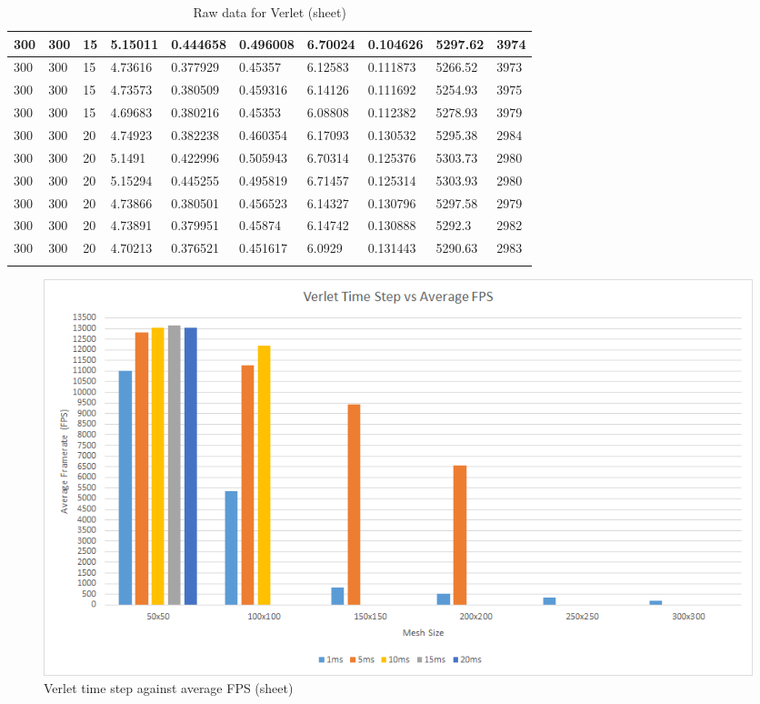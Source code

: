 \begin{landscape}
\begin{longtable}{ | l | l | l | l | l | l | l | l | l | l | }
300 & 300 & 15 & 5.15011 & 0.444658 & 0.496008 & 6.70024 & 0.104626 & 5297.62 & 3974\\ \hline
300 & 300 & 15 & 4.73616 & 0.377929 & 0.45357 & 6.12583 & 0.111873 & 5266.52 & 3973\\ \hline
300 & 300 & 15 & 4.73573 & 0.380509 & 0.459316 & 6.14126 & 0.111692 & 5254.93 & 3975\\ \hline
300 & 300 & 15 & 4.69683 & 0.380216 & 0.45353 & 6.08808 & 0.112382 & 5278.93 & 3979\\ \hline
300 & 300 & 20 & 4.74923 & 0.382238 & 0.460354 & 6.17093 & 0.130532 & 5295.38 & 2984\\ \hline
300 & 300 & 20 & 5.1491 & 0.422996 & 0.505943 & 6.70314 & 0.125376 & 5303.73 & 2980\\ \hline
300 & 300 & 20 & 5.15294 & 0.445255 & 0.495819 & 6.71457 & 0.125314 & 5303.93 & 2980\\ \hline
300 & 300 & 20 & 4.73866 & 0.380501 & 0.456523 & 6.14327 & 0.130796 & 5297.58 & 2979\\ \hline
300 & 300 & 20 & 4.73891 & 0.379951 & 0.45874 & 6.14742 & 0.130888 & 5292.3 & 2982\\ \hline
300 & 300 & 20 & 4.70213 & 0.376521 & 0.451617 & 6.0929 & 0.131443 & 5290.63 & 2983\\ \hline
    \caption{Raw data for Verlet (sheet)}
    \label{tab:v raw sheet}
\end{longtable}

  \begin{figure}[!htb]
    \begin{center}
      \includegraphics{Figures/sheet_v_fps}
    \end{center}
    \caption{Verlet time step against average FPS (sheet)}
    \label{fig:v fps sheet}
  \end{figure}
\end{landscape}
  
